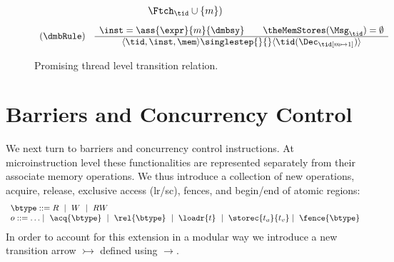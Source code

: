 \begin{figure}
\[\begin{array}{cc}
\begin{array}{c}
     \Ftch_\tid\cup\{m\})
\end{array}
\end{array}
\]
\[
\begin{array}{cc}
(\dmbRule)
&
\begin{array}{c}
\inst = \ass{\expr}{m}{\dmbsy} \qquad
\theMemStores(\Msg_\tid) = \emptyset \\ \hline
\langle \tid,\inst,\mem\rangle \singlestep{}{}
\langle \tid(\Dec_\tid[m\mapsto 1])\rangle
\end{array}
\end{array}
\]
%
\caption{Promising thread level transition relation.}
\label{fig:PromisingThreadTransitions}
\end{figure}

 


\section{Barriers and Concurrency Control}
%
We next turn to barriers and concurrency control instructions.
At microinstruction level these functionalities are represented separately from their associate memory operations. 
We thus introduce a collection of new operations, acquire, release, exclusive access (lr/sc), fences, and begin/end of atomic regions:
\[
\begin{array}{l}
\btype ::= R\ \mid\ W\ \mid\ RW \\
o ::= \ldots \mid\ \acq{\btype}\ \mid\ \rel{\btype}\ \mid\ \loadr{t}\ \mid\ \storec{t_a}{t_v}\mid\ \fence{\btype}
\end{array}
\]
In order to account for this extension in a modular way we introduce a
new transition arrow  $\rightarrowtail$ defined using $\rightarrow$.

